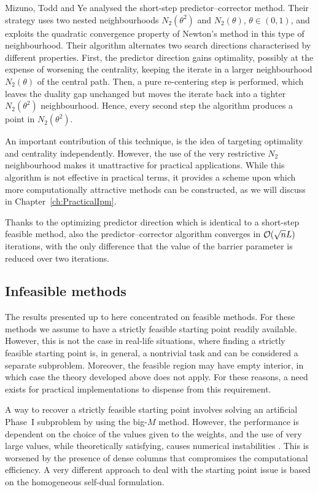Mizuno, Todd and Ye \cite{MizunoToddYe} analysed the short-step 
predictor--corrector method. Their strategy uses two nested neighbourhoods 
$N_2(\theta^2)$ and $N_2(\theta)$, $\theta \in (0,1)$, and exploits the
quadratic convergence property of Newton's method in this type of 
neighbourhood.
Their algorithm alternates two search directions characterised by
different properties.
First, the predictor direction gains optimality, possibly at the expense of
worsening the centrality, keeping the iterate in a larger neighbourhood
$N_2(\theta)$ of the central path. Then, a pure re-centering step 
is performed, which leaves the duality gap unchanged but 
moves the iterate back into a 
tighter $N_2(\theta^2)$ neighbourhood. Hence, every second step the 
algorithm produces a point in $N_2(\theta^2)$.

An important contribution of this technique, is the idea 
of targeting optimality and centrality independently. 
However, the use of the very restrictive $N_2$ neighbourhood 
makes it unattractive for practical applications.
While this 
algorithm is not effective in practical terms, it provides a scheme 
upon which more computationally attractive methods can be constructed,
as we will discuss in Chapter~\ref{ch:PracticalIpm}.

Thanks to the optimizing predictor direction which is identical
to a short-step feasible method, also the predictor--corrector
algorithm converges in $\mathcal{O}(\sqrt{n}L)$ iterations, with the only
difference that the value of the barrier parameter is reduced over
two iterations.

%
%
\subsection{Infeasible methods}
\label{sec:InfeasibleMethods}

The results presented up to here concentrated on feasible methods. 
For these methods we assume to have a strictly feasible starting point
readily available.
However, this is not the case in real-life situations, where finding 
a strictly feasible  starting point is, in general, a nontrivial task
and can be considered a separate subproblem.
Moreover, the feasible region may have empty interior,
in which case the theory developed above does not apply.
For these reasons, a need exists for practical 
implementations to dispense from this requirement.

A way to recover a strictly feasible starting point involves 
solving an artificial Phase~I subproblem by using 
the big-$M$ method. However, the performance is dependent on 
the choice of the values given to the weights, and the use
of very large values, while theoretically satisfying,
causes numerical instabilities \cite{Lustig91}.
This is worsened 
by the presence of dense columns that compromises the 
computational efficiency. A very different approach to deal 
with the starting point issue is based on the homogeneous 
self-dual formulation.


